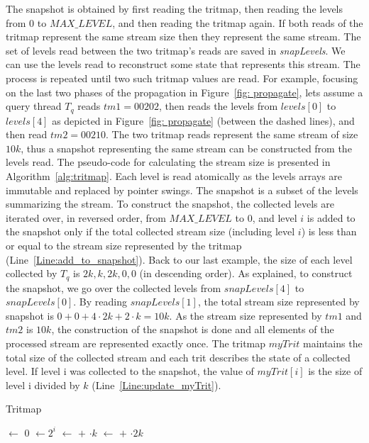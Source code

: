 The snapshot is obtained by first reading the tritmap, then reading the levels from $0$ to $MAX\_LEVEL$, and then reading the tritmap again. If both reads of the tritmap represent the same stream size then they represent the same stream. The set of levels read between the two tritmap's reads are saved in \emph{snapLevels}. We can use the levels read to reconstruct some state that represents this stream. The process is repeated until two such tritmap values are read. For example, focusing on the last two phases of the propagation in Figure~\ref{fig: propagate}, lets assume a query thread $T_q$ reads $tm1=00202$, then reads the levels from $\mathit{levels}[0]$ to $\mathit{levels}[4]$ as depicted in Figure~\ref{fig: propagate} (between the dashed lines), and then read $tm2=00210$. The two tritmap reads represent the same stream of size $10k$, thus a snapshot representing the same stream can be constructed from the levels read. The pseudo-code for calculating the stream size is presented in Algorithm~\ref{alg:tritmap}. Each level is read atomically as the levels arrays are immutable and replaced by pointer swings. The snapshot is a subset of the levels summarizing the stream. To construct the snapshot, the collected levels are iterated over, in reversed order, from $\mathit{MAX\_LEVEL}$ to $0$, and level $i$ is added to the snapshot only if the total collected stream size (including level $i$) is less than or equal to the stream size represented by the tritmap (Line~\ref{Line:add_to_snapshot}). Back to our last example, the size of each level collected by $T_q$ is ${2k,k,2k,0,0}$ (in descending order). As explained, to construct the snapshot, we go over the collected levels from $\mathit{snapLevels}[4]$ to $\mathit{snapLevels}[0]$. By reading $snapLevels[1]$, the total stream size represented by snapshot is $0+0+4\cdot2k+2\cdot k = 10k$. As the stream size represented by $tm1$ and $tm2$ is $10k$, the construction of the snapshot is done and all elements of the processed stream are represented exactly once. The tritmap $\mathit{myTrit}$ maintains the total size of the collected stream and each trit describes the state of a collected level. If level i was collected to the snapshot, the value of $\mathit{myTrit[i]}$ is the size of level i divided by $k$ (Line~\ref{Line:update_myTrit}). 

 
\begin{algorithm}[h]
\caption{Tritmap} \label{alg:tritmap}
\begin{algorithmic}[1]
\setcounter{ALG@line}{\value{mycounter}}
        \State {} $\gets$ 0
            \State {} $\gets 2^i $
                \State {} $\gets$  $+$ $\cdot k$
                     \State {} $\gets$  $+$ $\cdot 2k$
            \EndIf
        \EndFor
        \State {}
\EndProcedure
\setcounter{mycounter}{\value{ALG@line}}
\end{algorithmic}
\end{algorithm}
 
